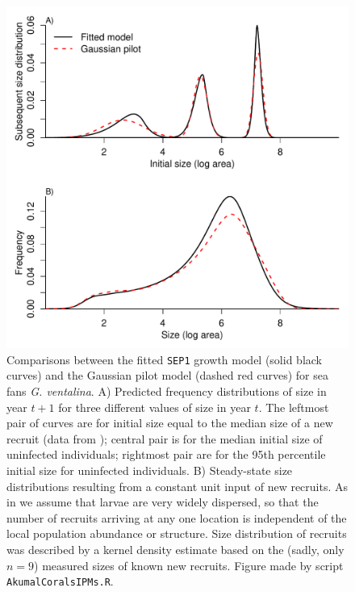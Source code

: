 \documentclass[11pt]{article}
\begin{document}
{\begin{figure}[tbp]
\centering
\includegraphics[width=.9\textwidth]{figures/CoralKernelCompare.pdf}
\caption{Comparisons between the fitted \texttt{SEP1} growth model (solid black curves) and the Gaussian pilot model (dashed red curves)
for sea fans \emph{G. ventalina}. A) Predicted frequency distributions of size in year $t+1$ for three different values of size in 
year $t$. The leftmost pair of curves are for initial size equal to the median size of a new recruit (data from \citep{bruno-etal-2011}); 
central pair is for the median initial size of uninfected individuals; rightmost pair are for the 95th percentile initial size for uninfected
individuals. B) Steady-state size distributions resulting from a constant unit input of new recruits. As in \citet{bruno-etal-2011} we
assume that larvae are very widely dispersed, so that the number of recruits arriving at any one location is independent of the local population
abundance or structure. Size distribution of recruits was described by a kernel density estimate based on the (sadly, only $n=9$) measured sizes
of known new recruits. Figure made by script \texttt{AkumalCoralsIPMs.R}.}
\label{fig:CoralKernelCompare}
\end{figure}  
 
 \clearpage   

}
\end{document}

